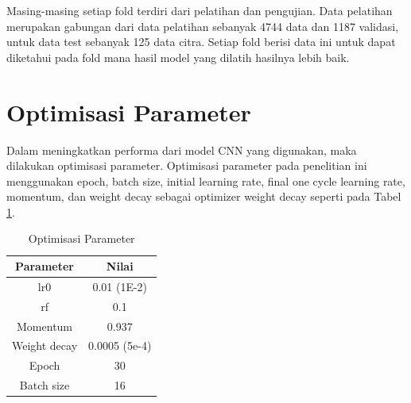 Masing-masing setiap fold terdiri dari pelatihan dan pengujian. Data pelatihan merupakan gabungan dari data pelatihan sebanyak 4744 data dan 1187 validasi, untuk data test sebanyak 125 data citra. Setiap fold berisi data ini untuk dapat diketahui pada fold mana hasil model yang dilatih hasilnya lebih baik. 

\section{Optimisasi Parameter}
\hspace{1,2cm}Dalam meningkatkan performa dari model CNN yang digunakan, maka dilakukan optimisasi parameter. Optimisasi parameter pada penelitian ini menggunakan epoch, batch size, initial learning rate, final one cycle learning rate, momentum, dan weight decay sebagai optimizer weight decay seperti pada Tabel \ref{tbl:Optimisasi-Parameter}.

\begin{singlespace}
	\begin{table}[H]
		\centering
		\caption{Optimisasi Parameter}
		\label{tbl:Optimisasi-Parameter}
		\begin{tabular}{|c|c|}
			\hline
			\rowcolor[HTML]{D9D9D9} 
			Parameter    & Nilai         \\ \hline
			lr0          & 0.01 (1E-2)   \\ \hline
			rf           & 0.1           \\ \hline
			Momentum     & 0.937         \\ \hline
			Weight decay & 0.0005 (5e-4) \\ \hline
			Epoch        & 30            \\ \hline
			Batch size   & 16            \\ \hline
		\end{tabular}
	\end{table}
\end{singlespace}

